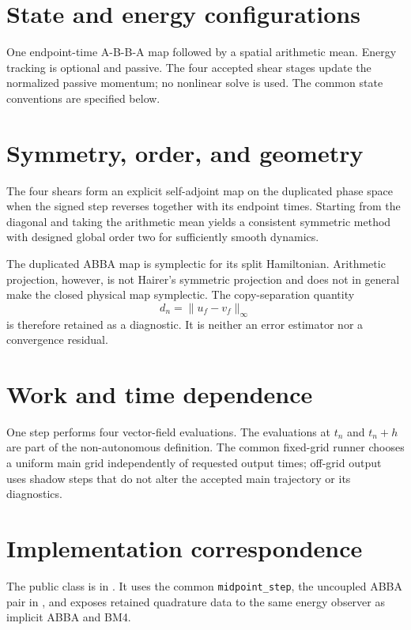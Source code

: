 \documentclass[11pt,a4paper]{article}
\begin{document}
\section{State and energy configurations}
One endpoint-time A-B-B-A map followed by a spatial arithmetic mean. Energy tracking is optional and passive.
The four accepted shear stages update the normalized passive momentum; no nonlinear solve is used.
The common state conventions are specified below.

\section{Symmetry, order, and geometry}

The four shears form an explicit self-adjoint map on the duplicated phase
space when the signed step reverses together with its endpoint times.  Starting
from the diagonal and taking the arithmetic mean yields a consistent symmetric
method with designed global order two for sufficiently smooth dynamics.

The duplicated ABBA map is symplectic for its split Hamiltonian.  Arithmetic
projection, however, is not Hairer's symmetric projection and does not in
general make the closed physical map symplectic.  The copy-separation quantity
\[
d_n=\lVert u_f-v_f\rVert_\infty
\]
is therefore retained as a diagnostic.  It is neither an error estimator nor
a convergence residual.

\section{Work and time dependence}

One step performs four vector-field evaluations.  The evaluations at $t_n$
and $t_n+h$ are part of the non-autonomous definition.  The common fixed-grid
runner chooses a uniform main grid independently of requested output times;
off-grid output uses shadow steps that do not alter the accepted main
trajectory or its diagnostics.

\section{Implementation correspondence}
The public class is in
. It uses the common
\texttt{midpoint\_step}, the uncoupled ABBA pair in ,
and exposes retained quadrature data to the same energy observer as implicit ABBA and BM4.
\end{document}
